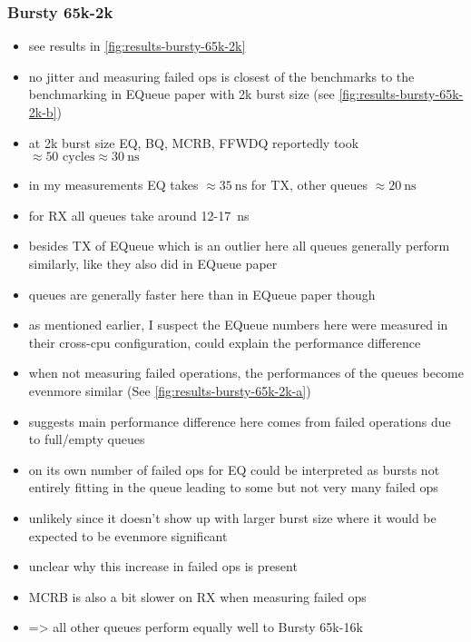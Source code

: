 \subsubsection{Bursty 65k-2k}
\begin{itemize}
    \item see results in \autoref{fig:results-bursty-65k-2k}
    \item no jitter and measuring failed ops is closest of the benchmarks to the benchmarking in EQueue paper
        with 2k burst size (see \autoref{fig:results-bursty-65k-2k-b})
    \item at 2k burst size EQ, BQ, MCRB, FFWDQ reportedly took $\approx 50\text{ cycles} \approx \SI{30}{\nano\second}$
    \item in my measurements EQ takes $\approx \SI{35}{\nano\second}$ for TX, other queues $\approx
        \SI{20}{\nano\second}$
    \item for RX all queues take around 12-\SI{17}{\nano\second}
    \item besides TX of EQueue which is an outlier here all queues generally perform similarly, like they also did
        in EQueue paper
    \item queues are generally faster here than in EQueue paper though
    \item as mentioned earlier, I suspect the EQueue numbers here were measured in their cross-cpu
        configuration, could explain the performance difference
    \item when not measuring failed operations, the performances of the queues become evenmore similar (See
        \autoref{fig:results-bursty-65k-2k-a})
    \item suggests main performance difference here comes from failed operations due to full/empty queues
    \item on its own number of failed ops for EQ could be interpreted as bursts not entirely fitting in the queue leading to some but not very many failed ops
    \item unlikely since it doesn't show up with larger burst size where it would be expected to be evenmore significant
    \item unclear why this increase in failed ops is present
    \item MCRB is also a bit slower on RX when measuring failed ops
    \item => all other queues perform equally well to Bursty 65k-16k
\end{itemize}

